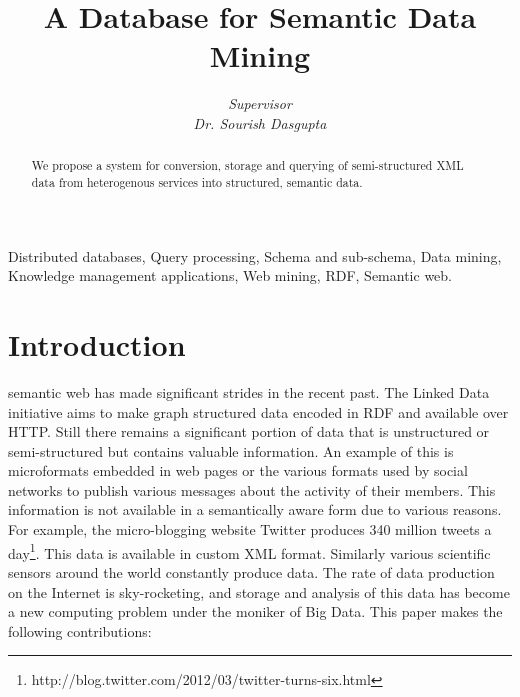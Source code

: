 \documentclass[conference]{IEEEtran}
\begin{document}
%
\title{A Database for Semantic Data Mining}
%
\author{
\emph{Supervisor}\\\emph{Dr. Sourish Dasgupta}
}%
%

\maketitle

\begin{abstract}
    We propose a system for conversion, storage and querying of semi-structured
    XML data from heterogenous services into structured, semantic data.
\end{abstract}

\begin{IEEEkeywords}
    Distributed databases, Query processing, Schema and sub-schema, Data
    mining, Knowledge management applications, Web mining, RDF, Semantic web.
\end{IEEEkeywords}

\section{Introduction}
 semantic web has made significant strides in the recent
past. The Linked Data initiative aims to make graph structured data encoded in
RDF and available over HTTP. Still there remains a significant portion of data
that is unstructured or semi-structured but contains valuable information. An
example of this is microformats\cite{Khare:06} embedded in web pages or the
various formats used by social networks to publish various messages about the
activity of their members. This information is not available in a semantically
aware form due to various reasons. For example, the micro-blogging website
Twitter produces
340 million tweets
a day\footnote{http://blog.twitter.com/2012/03/twitter-turns-six.html}.
This data is available in custom XML format. Similarly various scientific
sensors around the world constantly produce data. The rate of data
production on the Internet is sky-rocketing, and storage and analysis of
this data has become a new computing problem under the moniker of Big Data.
This paper makes the following contributions:
\end{document}
